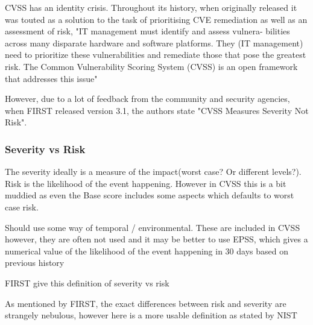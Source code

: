 \documentclass[12pt]{article}
\begin{document}
CVSS has an identity crisis. Throughout its history, when originally released it was touted as a
solution to the task of prioritising CVE remediation as well as an assessment of risk, "IT management must identify and assess vulnera-
bilities across many disparate hardware and software platforms. They (IT management) need to prioritize these
vulnerabilities and remediate those that pose the greatest risk. The Common Vulnerability Scoring System
(CVSS) is an open framework that addresses this issue"


However, due to a lot of feedback from the community and security agencies, when FIRST released
version 3.1, the authors state "CVSS Measures Severity Not Risk".

\subsubsection*{Severity vs Risk}

The severity ideally is a measure of the impact(worst case? Or different levels?). Risk is the
likelihood of the event happening. However in CVSS this is a bit muddied as even the Base score
includes some aspects which defaults to worst case risk.

Should use some way of temporal / environmental. These are included in CVSS however, they are often
not used and it may be better to use EPSS, which gives a numerical value of the likelihood of the
event happening in 30 days based on previous history

FIRST give this definition of severity vs risk
\textit{}


As mentioned by FIRST, the exact differences between risk and severity are strangely nebulous,
however here is a more usable definition as stated by NIST
\end{document}
